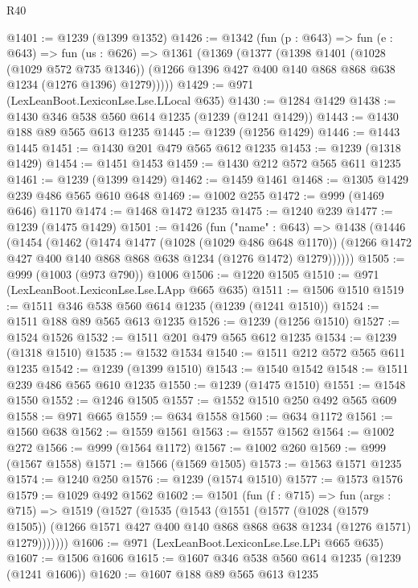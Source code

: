 \begin{lexlean}{R40}
\begin{coremodule}
@1401 := @1239 (@1399 @1352)
@1426 := @1342
    (fun (p : @643) =>
    fun (e : @643) =>
    fun (us : @626) =>
    @1361
      (@1369
        (@1377
          (@1398
            @1401
            (@1028 (@1029 @572 @735 @1346))
            (@1266 @1396 @427 @400 @140 @868 @868 @638 @1234 (@1276 @1396) @1279)))))
@1429 := @971 (LexLeanBoot.LexiconLse.Lse.LLocal @635)
@1430 := @1284 @1429
@1438 := @1430 @346 @538 @560 @614 @1235 (@1239 (@1241 @1429))
@1443 := @1430 @188 @89 @565 @613 @1235
@1445 := @1239 (@1256 @1429)
@1446 := @1443 @1445
@1451 := @1430 @201 @479 @565 @612 @1235
@1453 := @1239 (@1318 @1429)
@1454 := @1451 @1453
@1459 := @1430 @212 @572 @565 @611 @1235
@1461 := @1239 (@1399 @1429)
@1462 := @1459 @1461
@1468 := @1305 @1429 @239 @486 @565 @610 @648
@1469 := @1002 @255
@1472 := @999 (@1469 @646) @1170
@1474 := @1468 @1472 @1235
@1475 := @1240 @239
@1477 := @1239 (@1475 @1429)
@1501 := @1426
    (fun ("name" : @643) =>
    @1438
      (@1446
        (@1454
          (@1462
            (@1474
              @1477
              (@1028 (@1029 @486 @648 @1170))
              (@1266 @1472 @427 @400 @140 @868 @868 @638 @1234 (@1276 @1472) @1279))))))
@1505 := @999 (@1003 (@973 @790)) @1006
@1506 := @1220 @1505
@1510 := @971 (LexLeanBoot.LexiconLse.Lse.LApp @665 @635)
@1511 := @1506 @1510
@1519 := @1511 @346 @538 @560 @614 @1235 (@1239 (@1241 @1510))
@1524 := @1511 @188 @89 @565 @613 @1235
@1526 := @1239 (@1256 @1510)
@1527 := @1524 @1526
@1532 := @1511 @201 @479 @565 @612 @1235
@1534 := @1239 (@1318 @1510)
@1535 := @1532 @1534
@1540 := @1511 @212 @572 @565 @611 @1235
@1542 := @1239 (@1399 @1510)
@1543 := @1540 @1542
@1548 := @1511 @239 @486 @565 @610 @1235
@1550 := @1239 (@1475 @1510)
@1551 := @1548 @1550
@1552 := @1246 @1505
@1557 := @1552 @1510 @250 @492 @565 @609
@1558 := @971 @665
@1559 := @634 @1558
@1560 := @634 @1172
@1561 := @1560 @638
@1562 := @1559 @1561
@1563 := @1557 @1562
@1564 := @1002 @272
@1566 := @999 (@1564 @1172)
@1567 := @1002 @260
@1569 := @999 (@1567 @1558)
@1571 := @1566 (@1569 @1505)
@1573 := @1563 @1571 @1235
@1574 := @1240 @250
@1576 := @1239 (@1574 @1510)
@1577 := @1573 @1576
@1579 := @1029 @492 @1562
@1602 := @1501
    (fun (f : @715) =>
    fun (args : @715) =>
    @1519
      (@1527
        (@1535
          (@1543
            (@1551
              (@1577
                (@1028 (@1579 @1505))
                (@1266 @1571 @427 @400 @140 @868 @868 @638 @1234 (@1276 @1571) @1279)))))))
@1606 := @971 (LexLeanBoot.LexiconLse.Lse.LPi @665 @635)
@1607 := @1506 @1606
@1615 := @1607 @346 @538 @560 @614 @1235 (@1239 (@1241 @1606))
@1620 := @1607 @188 @89 @565 @613 @1235

\end{coremodule}
\end{lexlean}
